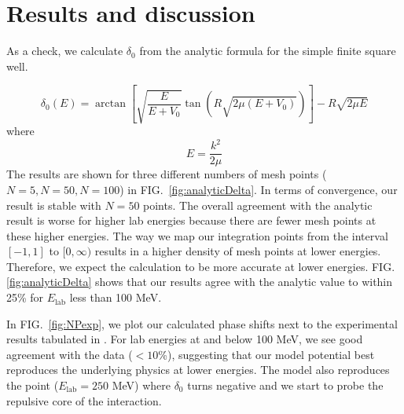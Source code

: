 \documentclass[10pt,showpacs,preprintnumbers,footinbib,amsmath,amssymb,aps,prl,twocolumn,groupedaddress,superscriptaddress,showkeys]{revtex4-1}
\begin{document}
\section{Results and discussion}

As a check, we calculate $\delta _0$ from the analytic formula for the simple finite square
well.

\begin{equation}
	\delta _0(E) = \arctan \left [ \sqrt{\frac{E}{E+V_0}} \tan \left ( R \sqrt{2 \mu (E + V_0)}
 \right ) \right ] - R \sqrt{2 \mu E}
	\label{eq:deltaAnalytic}
\end{equation}
where
\begin{equation*}
	E = \frac{k^2}{2 \mu}
\end{equation*}
The results are shown for three different numbers of mesh points ($N=5,N=50,N=100$) in
FIG.~\ref{fig:analyticDelta}. In terms of convergence, our result is stable with $N=50$ points.
The overall agreement with the analytic result is worse for higher lab energies because there
are fewer mesh points at these higher energies. The way we map our integration points from
the interval $[-1,1]$ to $[0,\infty)$ results in a higher density of mesh points at lower energies.
Therefore, we expect the calculation to be more accurate at lower energies. FIG.~
\ref{fig:analyticDelta}
shows that our results agree with the analytic value to within 25\% for $E_{\mathrm{lab}}$ less
than 100 MeV.

In FIG.~\ref{fig:NPexp}, we plot our calculated phase shifts next to the experimental results
tabulated in \citep{Nijmegen}. For lab energies at and below 100 MeV, we see good agreement
with the data ($< 10$\%), suggesting that our model potential best reproduces the underlying
physics at lower energies. The model also reproduces the point ($E_{\mathrm{lab}} = 250$ MeV)
where $\delta_0$ turns negative and we start to probe the repulsive core of the interaction.




\end{document}
